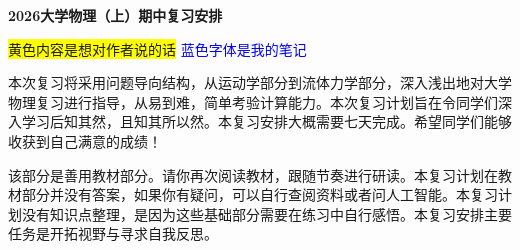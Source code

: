 \documentclass[12pt,a4paper]{article}
\begin{document}
\begin{center}
\LARGE\bfseries 2026大学物理（上）期中复习安排
\end{center}

\colorbox{yellow}{黄色内容是想对作者说的话}
\textcolor{blue}{蓝色字体是我的笔记}
\vspace{1em}

本次复习将采用问题导向结构，从运动学部分到流体力学部分，深入浅出地对大学物理复习进行指导，从易到难，简单考验计算能力。本次复习计划旨在令同学们深入学习后知其然，且知其所以然。本复习安排大概需要七天完成。希望同学们能够收获到自己满意的成绩！

\vspace{1em}

该部分是善用教材部分。请你再次阅读教材，跟随节奏进行研读。本复习计划在教材部分并没有答案，如果你有疑问，可以自行查阅资料或者问人工智能。本复习计划没有知识点整理，是因为这些基础部分需要在练习中自行感悟。本复习安排主要任务是开拓视野与寻求自我反思。
\end{document}
